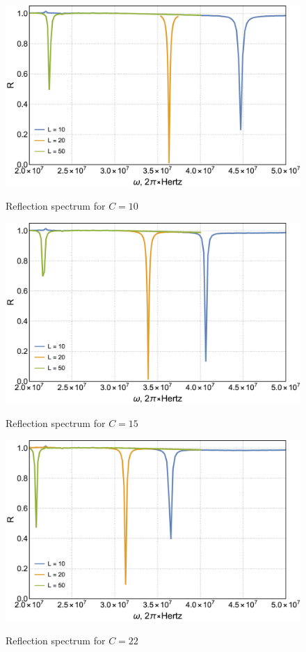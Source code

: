 \begin{figure}[h]
	\centering
	\includegraphics[width=\textwidth]{images/R_plot_C_10}
	\label{fig:R_C_10}
	\caption{Reflection spectrum for $C = 10$}
\end{figure}
\begin{figure}[h]
	\centering
	\includegraphics[width=\textwidth]{images/R_plot_C_15}
	\label{fig:R_C_10}
	\caption{Reflection spectrum for $C = 15$}
\end{figure}
\FloatBarrier
\begin{figure}[h]
	\centering
	\includegraphics[width=\textwidth]{images/R_plot_C_22}
	\label{fig:R_C_10}
	\caption{Reflection spectrum for $C = 22$}
\end{figure}

